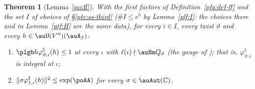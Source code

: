 \documentclass[10pt]{amsart}
\newtheorem{theorem}{Theorem}[section]
\theoremstyle{definition}
\theoremstyle{remark}
\newcommand{\C}{\mathbb C}
\begin{document}
\begin{theorem}[Lemma~\ref{po:ff}]\label{pfq:ff}
With the first factors of Definition~\ref{pfq:def-ff} and the set $I$ of choices of \S\ref{pte:ss-third} ($\#I\le e^b$ by
Lemma~\ref{plf:I}: the choices there and in Lemma~\ref{ptf:H} are the same data), for every $i\in I$, every twist $\vartheta$
and every $h\in\auU(V'')(\auA_f)$:
\begin{enumerate}
\item[(I1)] $\plgb h{\varphi^\natural_{\vartheta,i}(h)}\le1$ at every $\iota$ with $\ell(\iota)\nmid\auNm Q_\vartheta$ (the gauge of
{\cite[\S6.1]{P49}}); that is, $\varphi^\natural_{\vartheta,i}$ is integral at $\iota$;
\item[(I2)] $\|\sigma\varphi^\natural_{1,i}(h)\|^2\le\exp(\poAA)$ for every $\sigma\in\auAut(\C)$.
\end{enumerate}
\end{theorem}
\end{document}
